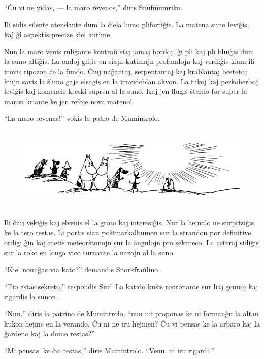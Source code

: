 ``Ĉu vi ne vidas, --- la maro revenos,'' diris Snufmumriko.

Ili sidis silente atendante dum la ĉiela lumo plifortiĝis. La matena suno leviĝis, kaj ĝi aspektis precize kiel kutime.

Nun la maro venis ruliĝante kontraŭ siaj iamaj bordoj, ĝi pli kaj pli bluiĝis dum la suno altiĝis. La ondoj glitis en siajn kutimajn profundojn kaj verdiĝis kiam ili trovis ripozon ĉe la fundo. Ĉiuj naĝantaj, serpentantaj kaj krablantaj bestetoj kiujn savis la ŝlimo gaje elsagis en la travideblan akvon. La fukoj kaj perkoherboj leviĝis kaj komencis kreski supren al la suno. Kaj jen flugis ŝterno for super la maron kriante ke jen refoje nova mateno!

``La maro revenas!'' vokis la patro de Mumintrolo.

\begin{figure}[htbp]
\centering
\includegraphics[width=450pt,height=115pt]{10-2.png}
\caption{}
\label{10-2}
\end{figure}

Ili ĉiuj vekiĝis kaj elvenis el la groto kaj interesiĝis. Nur la hemulo ne surpriziĝis, ke la tero restas. Li portis sian poŝtmarkalbumon sur la strandon por definitive ordigi ĝin kaj metis meteorŝtonojn sur la angulojn pro sekureco. La ceteraj sidiĝis sur la roko en longa vico turnante la nazojn al la suno.

``Kiel nomiĝas via kato?'' demandis Snorkfraŭlino.

``Tio estas sekreto,'' respondis Snif. La katido kuŝis ronronante sur liaj genuoj kaj rigardis la sunon.

``Nun,'' diris la patrino de Mumintrolo, ``nun mi proponas ke ni formanĝu la altan kukon hejme en la verando. Ĉu ni ne iru hejmen? Ĉu vi pensas ke la arbaro kaj la ĝardeno kaj la domo restas?''

``Mi pensas, ke ĉio restas,'' diris Mumintrolo. ``Venu, ni iru rigardi!''



